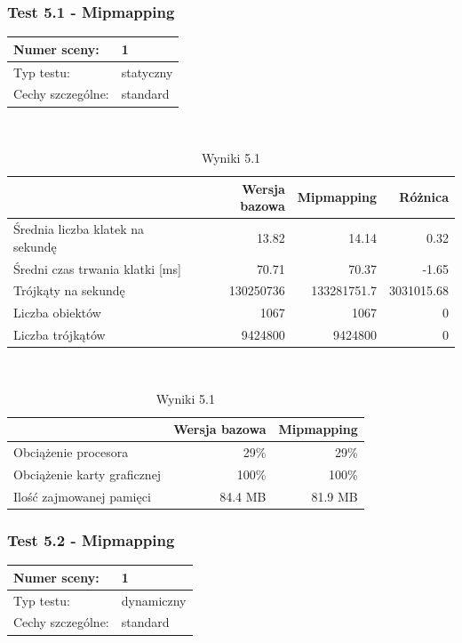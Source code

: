 \documentclass[a4paper,twoside,12pt]{book}
\begin{document}
\subsubsection{Test 5.1 - Mipmapping}
\begin{tabular}{|l||l|}
\hline
Numer sceny: & 1 \\
\hline
Typ testu: & statyczny \\
\hline
Cechy szczególne: & standard \\
\hline
\end{tabular}\\

\vbox{}

\begin{table}[H]
    \centering
    \caption{Wyniki 5.1}
    \label{tab:mipmapping_test1}
    \begin{tabular}{|l||r|r|r|}
        \hline
        & Wersja bazowa & Mipmapping & Różnica \\
        \hline
        Średnia liczba klatek na sekundę & 13.82 & 14.14 & 0.32 \\
        \hline
        Średni czas trwania klatki [ms] & 70.71 & 70.37 & -1.65 \\
        \hline
        Trójkąty na sekundę & 130250736 & 133281751.7 & 3031015.68 \\
        \hline
        Liczba obiektów & 1067 & 1067 & 0 \\
        \hline
        Liczba trójkątów & 9424800 & 9424800 & 0 \\
        \hline
    \end{tabular} \\
    
    \vspace*{0.5 cm}
    
    \begin{tabular}{|l||r|r|}
         \hline
        & Wersja bazowa & Mipmapping \\
         \hline
        Obciążenie procesora & 29\% & 29\% \\
        \hline
        Obciążenie karty graficznej & 100\% & 100\% \\
        \hline
        Ilość zajmowanej pamięci & 84.4 MB & 81.9 MB \\
        \hline
    \end{tabular}
\end{table}

\vbox{}

\subsubsection{Test 5.2 - Mipmapping}
\begin{tabular}{|l||l|}
\hline
Numer sceny: & 1 \\
\hline
Typ testu: & dynamiczny \\
\hline
Cechy szczególne: & standard \\
\hline
\end{tabular}\\
\end{document}
